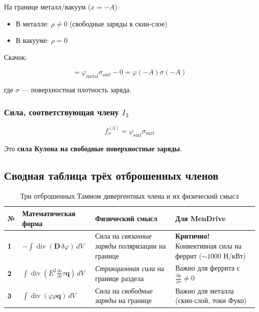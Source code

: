 \documentclass[a4paper,12pt]{article}
\begin{document}
На границе металл/вакуум ($x = -A$):
\begin{itemize}
    \item В металле: $\rho \neq 0$ (свободные заряды в скин-слое)
    \item В вакууме: $\rho = 0$
\end{itemize}

Скачок:

\begin{equation}
[\varphi\rho] = \varphi_{\text{metal}}\sigma_{\text{surf}} - 0 = \varphi(-A)\sigma(-A)
\label{eq:jump_phi_rho}
\end{equation}

где $\sigma$ --- поверхностная плотность заряда.

\subsubsection{Сила, соответствующая члену $I_3$}

\begin{equation}
\boxed{
f_x^{(3)} = \varphi_{\text{surf}}\sigma_{\text{surf}}
}
\label{eq:force_term_3}
\end{equation}

Это \textbf{сила Кулона на свободные поверхностные заряды}.


\subsection{Сводная таблица трёх отброшенных членов}

\begin{table}[h]
\centering
\caption{Три отброшенных Таммом дивергентных члена и их физический смысл}
\label{tab:discarded_terms_summary}
\begin{tabular}{@{}p{}@{}p{}@{}p{}@{}p{}@{}}
\toprule
\textbf{№} & \textbf{Математическая форма} & \textbf{Физический смысл} & \textbf{Для MenDrive} \\
\midrule
\textbf{1} & $-\int\operatorname{div}(\mathbf{D}\,\delta\varphi)\,dV$ &
Сила на \textit{связанные заряды} поляризации на границе &
\textbf{Критично!} Конвективная сила на феррит ($\sim 1000$ Н/кВт) \\
\midrule
\textbf{2} & $\int\operatorname{div}\!\left(E^2\frac{\partial\varepsilon}{\partial\tau}\tau\mathbf{q}\right)\,dV$ &
\textit{Стрикционная сила} на границе раздела &
Важно для феррита с $\frac{\partial\mu}{\partial\tau} \neq 0$ \\
\midrule
\textbf{3} & $\int\operatorname{div}(\varphi\rho\mathbf{q})\,dV$ &
Сила на \textit{свободные заряды} на границе &
Важно для металла (скин-слой, токи Фуко) \\
\bottomrule
\end{tabular}
\end{table}
\end{document}
